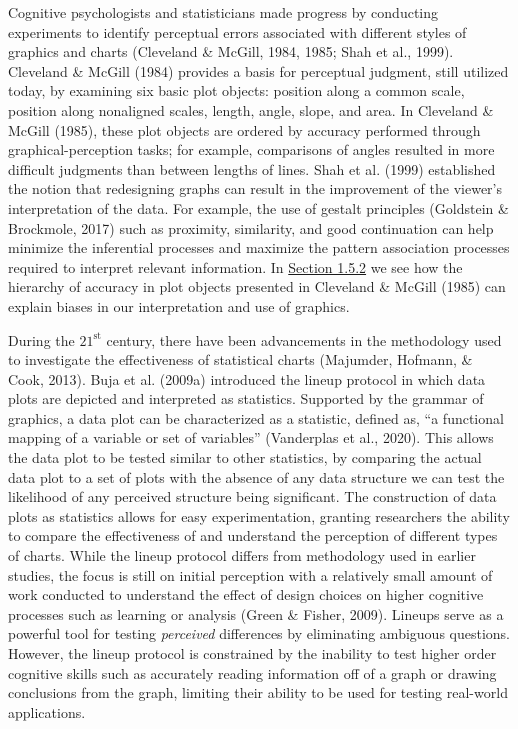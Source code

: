 \documentclass[print]{nuthesis}
\begin{document}
Cognitive psychologists and statisticians made progress by conducting experiments to identify perceptual errors associated with different styles of graphics and charts (Cleveland \& McGill, 1984, 1985; Shah et al., 1999).
Cleveland \& McGill (1984) provides a basis for perceptual judgment, still utilized today, by examining six basic plot objects: position along a common scale, position along nonaligned scales, length, angle, slope, and area.
In Cleveland \& McGill (1985), these plot objects are ordered by accuracy performed through graphical-perception tasks; for example, comparisons of angles resulted in more difficult judgments than between lengths of lines.
Shah et al. (1999) established the notion that redesigning graphs can result in the improvement of the viewer's interpretation of the data.
For example, the use of gestalt principles (Goldstein \& Brockmole, 2017) such as proximity, similarity, and good continuation can help minimize the inferential processes and maximize the pattern association processes required to interpret relevant information.
In \protect\hyperlink{underestimation}{Section 1.5.2} we see how the hierarchy of accuracy in plot objects presented in Cleveland \& McGill (1985) can explain biases in our interpretation and use of graphics.

During the \(\text{21}^{\text{st}}\) century, there have been advancements in the methodology used to investigate the effectiveness of statistical charts (Majumder, Hofmann, \& Cook, 2013).
Buja et al. (2009a) introduced the lineup protocol in which data plots are depicted and interpreted as statistics.
Supported by the grammar of graphics, a data plot can be characterized as a statistic, defined as, ``a functional mapping of a variable or set of variables'' (Vanderplas et al., 2020).
This allows the data plot to be tested similar to other statistics, by comparing the actual data plot to a set of plots with the absence of any data structure we can test the likelihood of any perceived structure being significant.
The construction of data plots as statistics allows for easy experimentation, granting researchers the ability to compare the effectiveness of and understand the perception of different types of charts.
While the lineup protocol differs from methodology used in earlier studies, the focus is still on initial perception with a relatively small amount of work conducted to understand the effect of design choices on higher cognitive processes such as learning or analysis (Green \& Fisher, 2009).
Lineups serve as a powerful tool for testing \emph{perceived} differences by eliminating ambiguous questions.
However, the lineup protocol is constrained by the inability to test higher order cognitive skills such as accurately reading information off of a graph or drawing conclusions from the graph, limiting their ability to be used for testing real-world applications.
\end{document}
